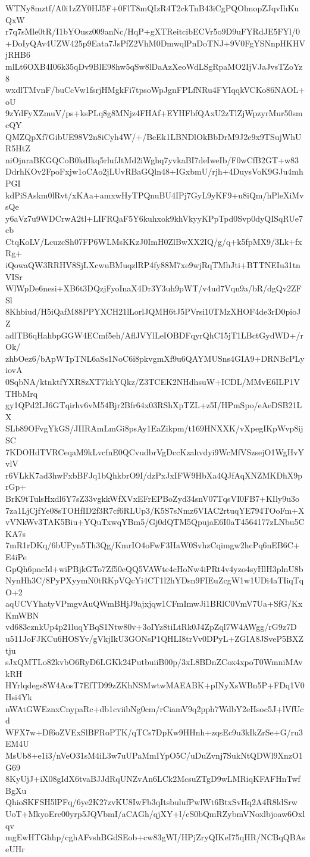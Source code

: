 WTNy8mztf/A0i1zZY0HJ5F+0FlT8mQIzR4T2ckTnB43iCgPQOlmopZJqvIhKuQxW
r7q7sMle0tR/I1bYOusz009anNc/HqP+gXTReitcibECVr5o9D9uFYRdJE5FYl/0
+DoIyQAv4UZW425p9Eata7JsPfZ2VhM0DmwqlPnDoTNJ+9V0FgYSNnpHKHVjRHB6
mlLt6OXB4I06k35qDv9BlE98hw5qSw8lDaAzXeoWdLSgRpaMO2IjVJaJvsTZoYz8
wxdlTMvnF/buCcVw1fsrjHMgkFi7tpsoWpJgnFPLfNRu4FYIqqkVCKo86NAOL+oU
9zYdFyXZmuV/ps+ksPLq8g8MNjz4FHAf+EYHFbfQAxU2zTlZjWpzyrMur50smcQY
QMZQpXf7GibUE98V2n8iCyh4W/+/BeEk1LBNDlOkBbDrM9J2e9x9TSujWhUR5HtZ
niOjnraBKGQCoB0kdIkq5rlufJtMd2iWghq7yvkaBI7deIweIb/F0wCfB2GT+w83
DdrhKOv2FpoFxjw1oCAo2jLUvRBaGQln48+IGxbmU/rjh+4DuysVoK9GJu4mhPGI
kdPiSAskm0lRvt/xKAa+amxwHyTPQnuBU4IPj7GyL9yKF9+u8iQm/hPleXiMvsQe
y6aVz7u9WDCrwA2tl+LIFRQaF5Y6kuhxok9khVkyyKPpTpd0Svp0dyQISqRUe7cb
CtqKoLV/LcuzcSh07FP6WLMsKKzJ0ImH0ZlBwXX2IQ/g/q+k5fpMX9/3Lk+fxRg+
iQowaQW3RRHV8SjLXcwuBMuqzlRP4fy88M7xe9wjRqTMhJti+BTTNEIu31tnVISr
WlWpDe6nesi+XB6t3DQzjFyoInaX4Dr3Y3uh9pWT/v4ud7Vqn9a/bR/dgQv2ZFSl
8Khbiud/H5iQafM88PPYXCH21lLorlJQMH6tJ5PVrsi10TMzXHOF4de3rD0pioJZ
adlTB6qHahbpGGW4ECmf5eh/AflJVYlLeIOBDFqyrQhC15jT1LBctGydWD+/rOk/
zhbOez6/bApWTpTNL6aSs1NoC6i8pkvgmXf9u6QAYMUSns4GIA9+DRNBcPLyiovA
0SqbNA/ktnktfYXR8zXT7kkYQkz/Z3TCEK2NHdhsuW+ICDL/MMvE6ILP1VTHbMrq
gy1QPd2LJ6GTqirhv6vM54Bjr2Bfr64x03RShXpTZL+z5I/HPmSpo/eAeDSB21LX
SLb89OFvgYkGS/JIIRAmLmGi8psAy1EaZikpm/t169HNXXK/vXpegIKpWvp8ijSC
7KDOHdTVRCeqaM9kLvcfnE0QCvudbrVgDccKzahvdyi9WcMfVSzsejO1WgHvYvlV
r6VLkK7ad3hwFxbBFJq1bQhkbrO9I/dzPxJxIFW9HbXa4QJfAqXNZMKDhX9prGp+
BrK9tTulsHxdl6Y7sZ33vgkkWfXVxEFrEPBoZyd34snV07TqsVI0FB7+KIly9u3o
7za1LjCjfYe08sTOHfID2f3R7cf6RLUp3/K5S7sNmz6VIAC2rtuqYE794TOoFm+X
vVNkWv3TAK5Biu+YQuTxwqYBm5/Gj0dQTM5QpujaE6I0aT4564177zLNbu5CKA7s
7mR1rDKq/6bUPyn5Th3Qg/KmrIO4oFwF3HaW0SvhzCqimgw2hcPq6nEB6C+E4iPe
GpQh6pncId+wiPBjkGTo7Zf50eQQ5VAWte4cHoNw4iPRt4v4yzo4syHlH3plnU8b
NynHh3C/8PyPXyymN0tRKpVQcYi4CT1l2hYDsn9FIEuZcgW1w1UDi4aTIiqTqO+2
aqUCVYhatyVPmgvAuQWmBHjJ9ajxjqw1CFmImwJi1BRlC0VmV7Ua+SfG/KxKmWBN
vd683eznkUp4p21luqYBqS1Ntw80v+3oIYz8tiLtRk0J4ZpZql7W4AWgg/rG9z7D
u511JoFJKCu6HOSYv/gVkjIkU3GONsP1QHLI8trVv0DPyL+ZGIA8JSveP5BXZtju
sJxQMTLo82kvbO6RyD6LGKk24PutbuiiB00p/3xL8BDnZCox4xpoT0WmniMAvkRH
HYrlqdegs8W4AosT7EfTD99zZKhNSMwtwMAEABK+pINyXsWBn5P+FDq1V0Hsi4Yk
nWAtGWEznxCnypaRc+db1cviibNg0cm/rCiamV9q2pph7WdbY2eHsoc5J+lVfUcd
WFX7w+Df6oZVExSlBFRoPTK/qTCs7DpKw9HHnh+zqsEc9u3kIkZrSe+G/ru3EM4U
MsUb8+e1i3/nVeO31sM4iL3w7uUPaMmIYpO5C/uDuZvnj7SukNtQDWl9XnzO1G69
8KyUjJ+iX08gIdX6tvaBJJdRqUNZvAn6LCk2McsuZTgD9wLMRiqKFAFHnTwfBgXu
QhioSKFSH5lPFq/6ye2K27zvKU8IwFb3qItsbulufPwlWt6BtxSvHq2A4R8ldSrw
UoT+MkyoEre00yrp5JQVbmI/aCAGh/qjXY+l/cS0bQmRZybmVNoxlbjoaw6Oxlqv
mgEwHTGhhp/cghAFvshBGdSEob+cw83gWI/HPjZryQIKeI75qHR/NCBqQBAseUHr
